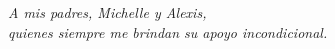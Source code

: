 \chapter*{}


\begin{flushright}
\textit{A mis padres, Michelle y Alexis,\\
 quienes siempre me brindan su apoyo incondicional.}
\end{flushright}

